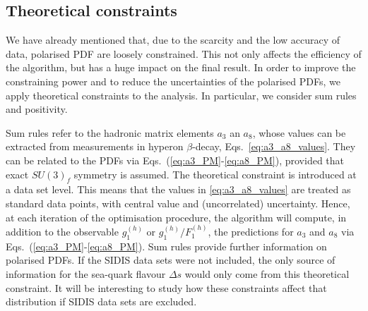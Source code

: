 \subsection*{Theoretical constraints}
We have already mentioned that, due to the scarcity and the low accuracy of data, polarised PDF are loosely constrained. This not only affects the efficiency of the algorithm, but has a huge impact on the final result. In order to improve the constraining power and to reduce the uncertainties of the polarised PDFs, we apply theoretical constraints to the analysis. In particular, we consider sum rules and positivity.%

Sum rules refer to the hadronic matrix elements $a_3$ an $a_8$, whose values can be extracted from measurements in hyperon $\beta$-decay, Eqs.~\eqref{eq:a3_a8_values}. They can be related to the PDFs via Eqs.~(\ref{eq:a3_PM}-\ref{eq:a8_PM}), provided that exact $SU(3)_f$ symmetry is assumed. The theoretical constraint is introduced at a data set level. This means that the values in \eqref{eq:a3_a8_values} are treated as standard data points, with central value and (uncorrelated) uncertainty. Hence, at each iteration of the optimisation procedure, the algorithm will compute, in addition to the observable $g_1^{(h)}$ or $g_1^{(h)}/F_1^{(h)}$, the predictions for $a_3$ and $a_8$ via Eqs.~(\ref{eq:a3_PM}-\ref{eq:a8_PM}). Sum rules provide further information on polarised PDFs. If the SIDIS data sets were not included, the only source of information for the sea-quark flavour $\Delta s$ would only come from this theoretical constraint. It will be interesting to study how these constraints affect that distribution if SIDIS data sets are excluded.%

